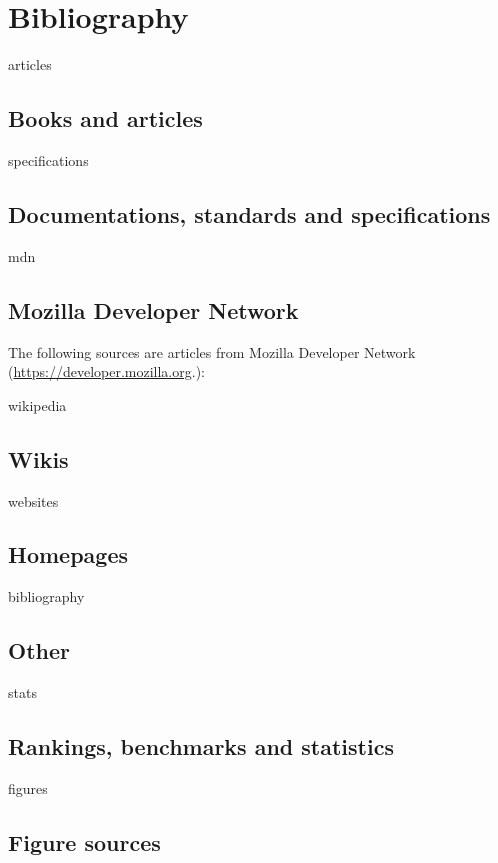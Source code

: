 
%

\chapter*{Bibliography}
\begin{btSect}{articles}
    \section*{Books and articles}
    \btPrintCited
\end{btSect}
\begin{btSect}{specifications}
    \section*{Documentations, standards and specifications}
    \btPrintCited
\end{btSect}
\begin{btSect}{mdn}
    \section*{Mozilla Developer Network}
    The following sources are articles from Mozilla Developer Network (\url{https://developer.mozilla.org}.):
    \btPrintCited
\end{btSect}
\begin{btSect}{wikipedia}
    \section*{Wikis}
    \btPrintCited
\end{btSect}
\begin{btSect}{websites}
    \section*{Homepages}
    \btPrintCited
\end{btSect}
\begin{btSect}{bibliography}
    \section*{Other}
    \btPrintCited
\end{btSect}
\begin{btSect}{stats}
    \section*{Rankings, benchmarks and statistics}
    \btPrintCited
\end{btSect}
\begin{btSect}{figures}
    \section*{Figure sources}
    \btPrintCited
\end{btSect}